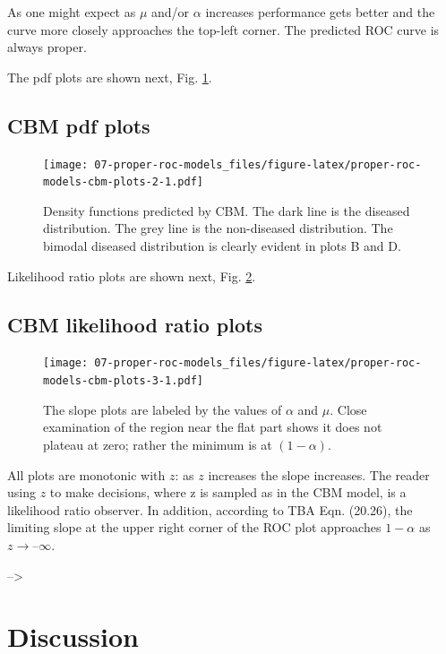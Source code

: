 \documentclass[
]{book}
\begin{document}
As one might expect as \(\mu\) and/or \(\alpha\) increases performance gets better and the curve more closely approaches the top-left corner. The predicted ROC curve is always proper.

The pdf plots are shown next, Fig. \ref{fig:proper-roc-models-cbm-plots-2}.

\hypertarget{proper-roc-models-cbm-pdfs}{%
\subsection{CBM pdf plots}\label{proper-roc-models-cbm-pdfs}}

\begin{figure}
\centering
\texttt{[image: 07-proper-roc-models\_files/figure-latex/proper-roc-models-cbm-plots-2-1.pdf]}
\caption{\label{fig:proper-roc-models-cbm-plots-2}Density functions predicted by CBM. The dark line is the diseased distribution. The grey line is the non-diseased distribution. The bimodal diseased distribution is clearly evident in plots B and D.}
\end{figure}

Likelihood ratio plots are shown next, Fig. \ref{fig:proper-roc-models-cbm-plots-3}.

\hypertarget{proper-roc-models-cbm-slopes}{%
\subsection{CBM likelihood ratio plots}\label{proper-roc-models-cbm-slopes}}

\begin{figure}
\centering
\texttt{[image: 07-proper-roc-models\_files/figure-latex/proper-roc-models-cbm-plots-3-1.pdf]}
\caption{\label{fig:proper-roc-models-cbm-plots-3}The slope plots are labeled by the values of \(\alpha\) and \(\mu\). Close examination of the region near the flat part shows it does not plateau at zero; rather the minimum is at \((1 - \alpha)\).}
\end{figure}

All plots are monotonic with \(z\): as \(z\) increases the slope increases. The reader using \(z\) to make decisions, where z is sampled as in the CBM model, is a likelihood ratio observer. In addition, according to TBA Eqn. (20.26), the limiting slope at the upper right corner of the ROC plot approaches \(1-\alpha\) as \(z \rightarrow –\infty\).

--\textgreater{}

\hypertarget{proper-roc-models-discussion}{%
\section{Discussion}\label{proper-roc-models-discussion}}
\end{document}
